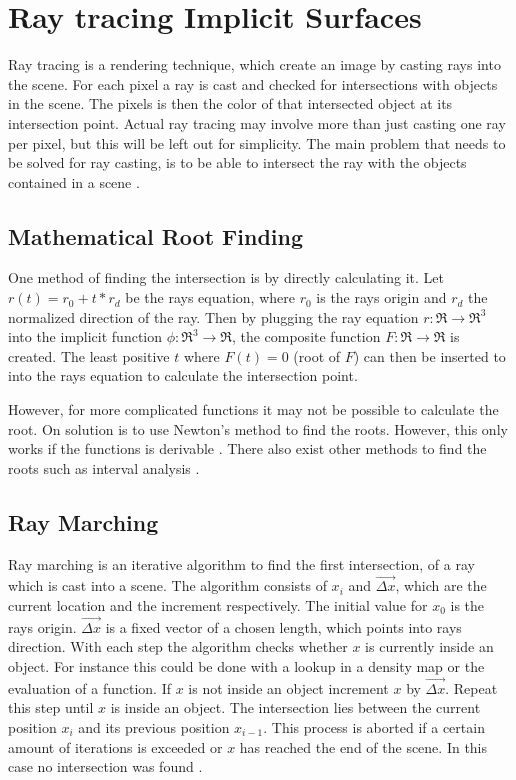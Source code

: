 \section{Ray tracing Implicit Surfaces}
Ray tracing is a rendering technique, which create an image by casting rays into the scene. For each pixel a ray is cast and checked for intersections with objects in the scene. The pixels is then the color of that intersected object at its intersection point. Actual ray tracing may involve more than just casting one ray per pixel, but this will be left out for simplicity. The main problem that needs to be solved for ray casting, is to be able to intersect the ray with the objects contained in a scene \cite{bungartz:2013:einfuhrung}.

\subsection{Mathematical Root Finding}
One method of finding the intersection is by directly calculating it. Let $r(t) = r_0 + t*r_d$ be the rays equation, where $r_0$ is the rays origin and $r_d$ the normalized direction of the ray. Then by plugging the ray equation $r : \Re \rightarrow \Re^{3} $ into the implicit function $\phi : \Re^{3} \rightarrow \Re $, the composite function $F : \Re \rightarrow \Re$ is created. The least positive $t$ where $F(t) = 0$ (root of $F$) can then be inserted to into the rays equation to calculate the intersection point\cite{hart:1996:sphere}.

However, for more complicated functions it may not be possible to calculate the root. On solution is to use Newton’s method to find the roots. However, this only works if the functions is derivable \cite{hart:1996:sphere}. There also exist other methods to find the roots such as interval analysis \cite{mitchell:1990:robust}.

\subsection{Ray Marching}
Ray marching is an iterative algorithm to find the first intersection, of a ray which is cast into a scene. The algorithm consists of $x_i$ and $\vec{ \Delta x}$, which are the current location and the increment respectively. The initial value for $x_0$ is the rays origin. $\vec{ \Delta x}$ is a fixed vector of a chosen length, which points into rays direction. With each step the algorithm checks whether $x$ is currently inside an object. For instance this could be done with a lookup in a density map or the evaluation of a function. If $x$ is not inside an object increment $x$ by $\vec{ \Delta x}$. Repeat this step until $x$ is inside an object. The intersection lies between the current position  $x_i$ and its previous position  $x_{i-1}$. This process is aborted if a certain amount of iterations is exceeded or $x$ has reached the end of the scene. In this case no intersection was found \cite{tuy:1984:direct} \cite{perlin:1989:hypertexture}.

